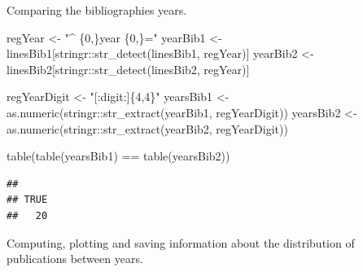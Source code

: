 \documentclass[
]{article}
\newenvironment{Shaded}{\begin{snugshade}}{\end{snugshade}}
\newcommand{\AttributeTok}[1]{\textcolor[rgb]{0.77,0.63,0.00}{#1}}
\newcommand{\FunctionTok}[1]{\textcolor[rgb]{0.00,0.00,0.00}{#1}}
\newcommand{\NormalTok}[1]{#1}
\newcommand{\OtherTok}[1]{\textcolor[rgb]{0.56,0.35,0.01}{#1}}
\newcommand{\SpecialCharTok}[1]{\textcolor[rgb]{0.00,0.00,0.00}{#1}}
\newcommand{\StringTok}[1]{\textcolor[rgb]{0.31,0.60,0.02}{#1}}
\begin{document}
Comparing the bibliographies years.

\begin{Shaded}
\begin{Highlighting}[]
\NormalTok{regYear }\OtherTok{\textless{}{-}} \StringTok{"\^{} \{0,\}year \{0,\}="}
\NormalTok{yearBib1 }\OtherTok{\textless{}{-}}\NormalTok{ linesBib1[stringr}\SpecialCharTok{::}\FunctionTok{str\_detect}\NormalTok{(linesBib1, regYear)]}
\NormalTok{yearBib2 }\OtherTok{\textless{}{-}}\NormalTok{ linesBib2[stringr}\SpecialCharTok{::}\FunctionTok{str\_detect}\NormalTok{(linesBib2, regYear)]}

\NormalTok{regYearDigit }\OtherTok{\textless{}{-}} \StringTok{"[:digit:]\{4,4\}"}
\NormalTok{yearsBib1 }\OtherTok{\textless{}{-}} \FunctionTok{as.numeric}\NormalTok{(stringr}\SpecialCharTok{::}\FunctionTok{str\_extract}\NormalTok{(yearBib1, regYearDigit))}
\NormalTok{yearsBib2 }\OtherTok{\textless{}{-}} \FunctionTok{as.numeric}\NormalTok{(stringr}\SpecialCharTok{::}\FunctionTok{str\_extract}\NormalTok{(yearBib2, regYearDigit))}

\FunctionTok{table}\NormalTok{(}\FunctionTok{table}\NormalTok{(yearsBib1) }\SpecialCharTok{==} \FunctionTok{table}\NormalTok{(yearsBib2))}
\end{Highlighting}
\end{Shaded}

\begin{verbatim}
## 
## TRUE 
##   20
\end{verbatim}

Computing, plotting and saving information about the distribution of publications between years.

\begin{Shaded}
\end{Shaded}
\end{document}
